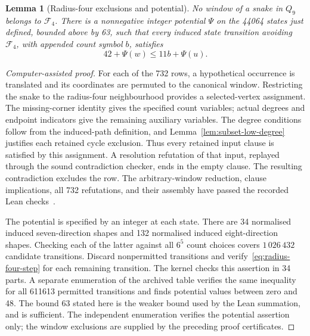 \documentclass[11pt,a4paper]{article}
\newtheorem{lemma}[theorem]{Lemma}
\theoremstyle{definition}
\theoremstyle{remark}
\newcommand{\Q}{Q}
\begin{document}
\begin{lemma}[Radius-four exclusions and potential]\label{lem:radius-four-certificate}
No window of a snake in $\Q_9$ belongs to $\mathcal F_4$. There is a nonnegative integer potential $\Psi$ on the 44064 states just defined, bounded above by 63, such that every induced state transition avoiding $\mathcal F_4$, with appended count symbol $b$, satisfies
\begin{equation}\label{eq:radius-four-step}
42+\Psi(w)\le11b+\Psi(u).
\end{equation}
\end{lemma}
\begin{proof}[Computer-assisted proof]
For each of the 732 rows, a hypothetical occurrence is translated and its coordinates are permuted to the canonical window. Restricting the snake to the radius-four neighbourhood provides a selected-vertex assignment. The missing-corner identity gives the specified count variables; actual degrees and endpoint indicators give the remaining auxiliary variables. The degree conditions follow from the induced-path definition, and Lemma~\ref{lem:subset-low-degree} justifies each retained cycle exclusion. Thus every retained input clause is satisfied by this assignment. A resolution refutation of that input, replayed through the sound contradiction checker, ends in the empty clause. The resulting contradiction excludes the row. The arbitrary-window reduction, clause implications, all 732 refutations, and their assembly have passed the recorded Lean checks~\cite{radiusfourarchive}.

The potential is specified by an integer at each state. There are 34 normalised induced seven-direction shapes and 132 normalised induced eight-direction shapes. Checking each of the latter against all $6^5$ count choices covers $1\,026\,432$ candidate transitions. Discard nonpermitted transitions and verify~\eqref{eq:radius-four-step} for each remaining transition. The kernel checks this assertion in 34 parts. A separate enumeration of the archived table verifies the same inequality for all 611613 permitted transitions and finds potential values between zero and 48. The bound 63 stated here is the weaker bound used by the Lean summation, and is sufficient. The independent enumeration verifies the potential assertion only; the window exclusions are supplied by the preceding proof certificates.
\end{proof}
\end{document}
